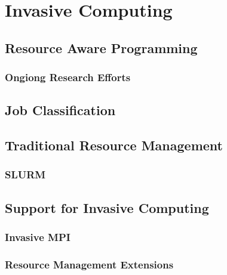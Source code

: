\chapter{Invasive Computing}\label{chapter:invasive computing}
\section{Resource Aware Programming}
\subsection{Ongiong Research Efforts}
\section{Job Classification}
\section{Traditional Resource Management}
\subsection{SLURM}
\section{Support for Invasive Computing}
\subsection{Invasive MPI}
\subsection{Resource Management Extensions}
